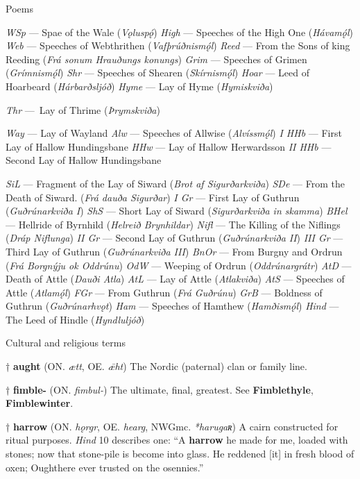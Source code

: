 Poems

\emph{WSp} — Spae of the Wale (\emph{Vǫluspǫ́})
\emph{High} — Speeches of the High One (\emph{Hávamǫ́l})
\emph{Web} — Speeches of Webthrithen (\emph{Vafþrúðnismǫ́l})
\emph{Reed} — From the Sons of king Reeding (\emph{Frá sonum Hrauðungs konungs})
\emph{Grim} — Speeches of Grimen (\emph{Grímnismǫ́l})
\emph{Shr} — Speeches of Shearen (\emph{Skírnismǫ́l})
\emph{Hoar} — Leed of Hoarbeard (\emph{Hárbarðsljóð})
\emph{Hyme} — Lay of Hyme (\emph{Hymiskviða})

\emph{Thr} — Lay of Thrime (\emph{Þrymskviða})

\emph{Way} — Lay of Wayland
\emph{Alw} — Speeches of Allwise (\emph{Alvíssmǫ́l})
\emph{I HHb} — First Lay of Hallow Hundingsbane
\emph{HHw} — Lay of Hallow Herwardsson
\emph{II HHb} — Second Lay of Hallow Hundingsbane

\emph{SiL} — Fragment of the Lay of Siward (\emph{Brot af Sigurðarkviða})
\emph{SDe} — From the Death of Siward. (\emph{Frá dauða Sigurðar})
\emph{I Gr} — First Lay of Guthrun (\emph{Guðrúnarkviða I})
\emph{ShS} — Short Lay of Siward (\emph{Sigurðarkviða in skamma})
\emph{BHel} — Hellride of Byrnhild (\emph{Helreið Brynhildar})
\emph{Nifl} — The Killing of the Niflings (\emph{Dráp Niflunga})
\emph{II Gr} — Second Lay of Guthrun (\emph{Guðrúnarkviða II})
\emph{III Gr} — Third Lay of Guthrun (\emph{Guðrúnarkviða III})
\emph{BnOr} — From Burgny and Ordrun (\emph{Frá Borgnýju ok Oddrúnu})
\emph{OdW} — Weeping of Ordrun (\emph{Oddrúnargrátr})
\emph{AtD} — Death of Attle (\emph{Dauði Atla})
\emph{AtL} — Lay of Attle (\emph{Atlakviða})
\emph{AtS} — Speeches of Attle (\emph{Atlamǫ́l})
\emph{FGr} — From Guthrun (\emph{Frá Guðrúnu})
\emph{GrB} — Boldness of Guthrun (\emph{Guðrúnarhvǫt})
\emph{Ham} — Speeches of Hamthew (\emph{Hamðismǫ́l})
\emph{Hind} — The Leed of Hindle (\emph{Hyndluljóð})



Cultural and religious terms

† \textbf{aught} (ON. \emph{ætt}, OE. \emph{ǣht})
 The Nordic (paternal) clan or family line.

† \textbf{fimble-} (ON. \emph{fimbul-})
 The ultimate, final, greatest. See \textbf{Fimblethyle}, \textbf{Fimblewinter}.

† \textbf{harrow} (ON. \emph{hǫrgr}, OE. \emph{hearg}, NWGmc. \emph{*harugaʀ})
 A cairn constructed for ritual purposes. \emph{Hind} 10 describes one: “A \textbf{harrow} he made for me, loaded with stones; now that stone-pile is become into glass. He reddened [it] in fresh blood of oxen; Oughthere ever trusted on the osennies.”

